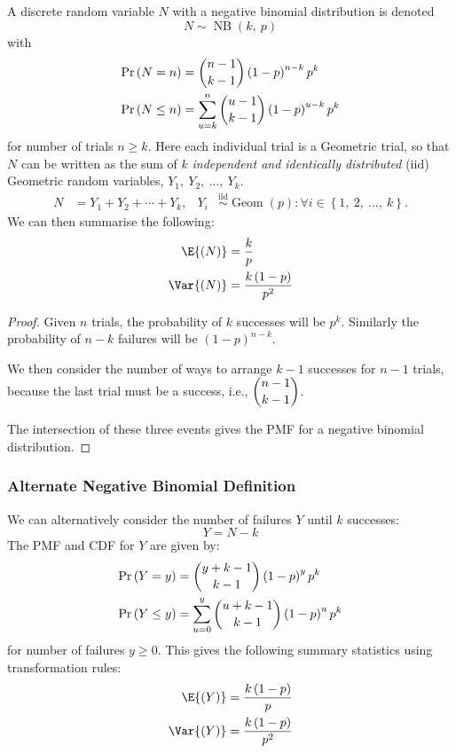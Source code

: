 \documentclass{article}
\begin{document}
A discrete random variable \(N\) with a negative binomial distribution is denoted
\begin{equation*}
    N \sim \operatorname{NB}{\left( k,\: p \right)}
\end{equation*}
with
\begin{align*}
    \Pr{\left( N = n \right)}    & = \dbinom{n - 1}{k - 1} \left( 1 - p \right)^{n - k} p^k                \\
    \Pr{\left( N \leq n \right)} & = \sum_{u = k}^n \dbinom{u - 1}{k - 1} \left( 1 - p \right)^{u - k} p^k
\end{align*}
for number of trials \(n \geq k\).
Here each individual trial is a Geometric trial, so that \(N\) can be written as the sum of
\(k\) \textit{independent and identically distributed} (iid) Geometric random variables, \(Y_1,\: Y_2,\: \dots,\: Y_k\).
\begin{align*}
    N & = Y_1 + Y_2 + \cdots + Y_k, & Y_i & \overset{\mathrm{iid}}{\sim} \operatorname{Geom}{\left( p \right)} : \forall i \in \left\{ 1,\: 2,\: \dots,\: k \right\}.
\end{align*}
We can then summarise the following:
\begin{align*}
    \E{\left( N \right)}   & = \frac{k}{p}                        \\
    \Var{\left( N \right)} & = \frac{k \left( 1 - p \right)}{p^2}
\end{align*}
\begin{proof}
    Given \(n\) trials, the probability of \(k\) successes will be \(p^k\).
    Similarly the probability of \(n - k\) failures will be \(\left( 1 - p \right)^{n - k}\).

    We then consider the number of ways to arrange \(k - 1\) successes for \(n - 1\) trials,
    because the last trial must be a success, i.e., \(\dbinom{n - 1}{k - 1}\).

    The intersection of these three events gives the PMF for a negative binomial distribution.
\end{proof}
\subsubsection{Alternate Negative Binomial Definition}
We can alternatively consider the number of failures \(Y\) until \(k\) successes:
\begin{equation*}
    Y = N - k
\end{equation*}
The PMF and CDF for \(Y\) are given by:
\begin{align*}
    \Pr{\left( Y = y \right)}    & = \dbinom{y + k - 1}{k - 1} \left( 1 - p \right)^y p^k                \\
    \Pr{\left( Y \leq y \right)} & = \sum_{u = 0}^y \dbinom{u + k - 1}{k - 1} \left( 1 - p \right)^u p^k
\end{align*}
for number of failures \(y \geq 0\). This gives the following summary statistics using
transformation rules:
\begin{align*}
    \E{\left( Y \right)}   & = \frac{k \left( 1 - p \right)}{p}   \\
    \Var{\left( Y \right)} & = \frac{k \left( 1 - p \right)}{p^2}
\end{align*}
\end{document}
